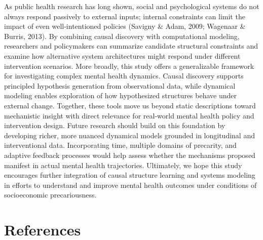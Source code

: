 \documentclass[
]{article}
\begin{document}
As public health research has long shown, social and psychological
systems do not always respond passively to external inputs; internal
constraints can limit the impact of even well-intentioned policies
(Savigny \& Adam, 2009; Wagenaar \& Burris, 2013).
\textcolor{BrickRed}{By combining causal discovery with computational modeling, researchers and policymakers can summarize candidate structural constraints and examine how alternative system architectures might respond under different intervention scenarios.}
More broadly, this study offers a generalizable framework for
investigating complex mental health dynamics. Causal discovery supports
principled hypothesis generation from observational data, while
dynamical modeling enables exploration of how hypothesized structures
behave under external change. Together, these tools move us beyond
static descriptions toward mechanistic insight with direct relevance for
real-world mental health policy and intervention design. Future research
should build on this foundation by developing richer, more nuanced
dynamical models grounded in longitudinal and interventional data.
Incorporating time, multiple domains of precarity, and adaptive feedback
processes would help assess whether the mechanisms proposed manifest in
actual mental health trajectories. Ultimately, we hope this study
encourages further integration of causal structure learning and systems
modeling in efforts to understand and improve mental health outcomes
under conditions of socioeconomic precariousness.

\section{References}\label{references}
\end{document}
